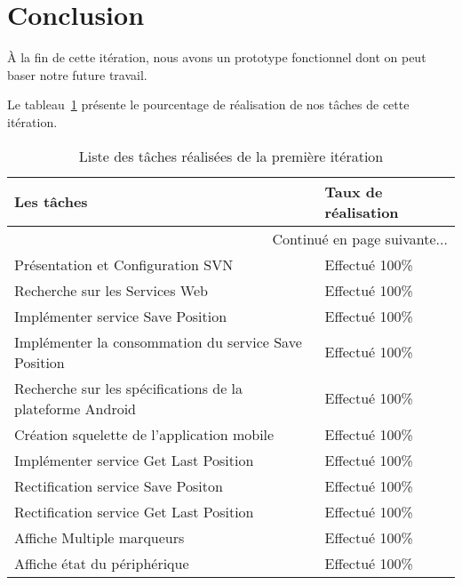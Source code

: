 \section*{Conclusion}

À la fin de cette itération, nous avons un prototype fonctionnel dont on peut
baser notre future travail.

Le tableau~\ref{tab:sprint1-evaluation} présente le pourcentage de réalisation
de nos tâches de cette itération.

\begin{center}
    \begin{longtable}{| l | l |}
        \caption{Liste des tâches réalisées de la première itération}
\label{tab:sprint1-evaluation} \\

        \hline
        \textbf{Les tâches} & \textbf{Taux de réalisation} \\ \hline
        \endhead

        \hline \multicolumn{2}{|r|}{{Continué en page suivante$\dotsc$}} \\ \hline
        \endfoot

        \hline \hline
        \endlastfoot

        \hline
Présentation et Configuration SVN & Effectué 100\% \\ \hline
Recherche sur les Services Web & Effectué 100\% \\ \hline
Implémenter service Save Position & Effectué 100\% \\ \hline
Implémenter la consommation du service Save Position & Effectué 100\% \\ \hline
Recherche sur les spécifications de la plateforme Android & Effectué 100\% \\ \hline
Création squelette de l'application mobile & Effectué 100\% \\ \hline
Implémenter service Get Last Position & Effectué 100\% \\ \hline
Rectification service Save Positon & Effectué 100\% \\ \hline
Rectification service Get Last Position & Effectué 100\% \\ \hline
Affiche Multiple marqueurs & Effectué 100\% \\ \hline
Affiche état du périphérique & Effectué 100\% \\ \hline
    \end{longtable}
\end{center}
